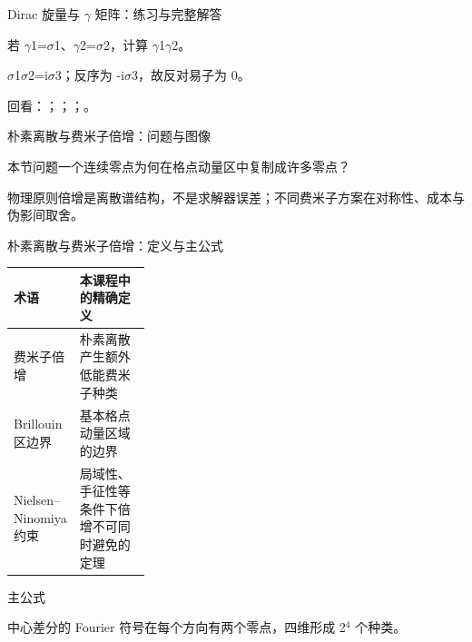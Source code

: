 \begin{frame}[t]{Dirac 旋量与 \ensuremath{\gamma} 矩阵：练习与完整解答}
\footnotesize
\begin{block}{}若 \ensuremath{\gamma}1=\ensuremath{\sigma}1、\ensuremath{\gamma}2=\ensuremath{\sigma}2，计算 \ensuremath{\gamma}1\ensuremath{\gamma}2。\end{block}
\begin{exampleblock}{}\ensuremath{\sigma}1\ensuremath{\sigma}2=i\ensuremath{\sigma}3；反序为 -i\ensuremath{\sigma}3，故反对易子为 0。\end{exampleblock}
\vfill
\scriptsize 回看：；；；。
\end{frame}

\begin{frame}[t]{朴素离散与费米子倍增：问题与图像}
\footnotesize
\begin{block}{本节问题}一个连续零点为何在格点动量区中复制成许多零点？\end{block}
\begin{block}{物理原则}\quad 倍增是离散谱结构，不是求解器误差；不同费米子方案在对称性、成本与伪影间取舍。\end{block}
\end{frame}

\begin{frame}[t]{朴素离散与费米子倍增：定义与主公式}
\footnotesize\begin{tabularx}{\linewidth}{p{0.30\linewidth}Y}
\toprule 术语 & 本课程中的精确定义\\\midrule
{} 费米子倍增 & 朴素离散产生额外低能费米子种类\\
 Brillouin 区边界 & 基本格点动量区域的边界\\
 Nielsen--Ninomiya 约束 & 局域性、手征性等条件下倍增不可同时避免的定理\\
\bottomrule\end{tabularx}\vspace{0.15cm}
\begin{block}{ 主公式}\centering{}\end{block}
中心差分的 Fourier 符号在每个方向有两个零点，四维形成 2\ensuremath{^{4}} 个种类。
\end{frame}

